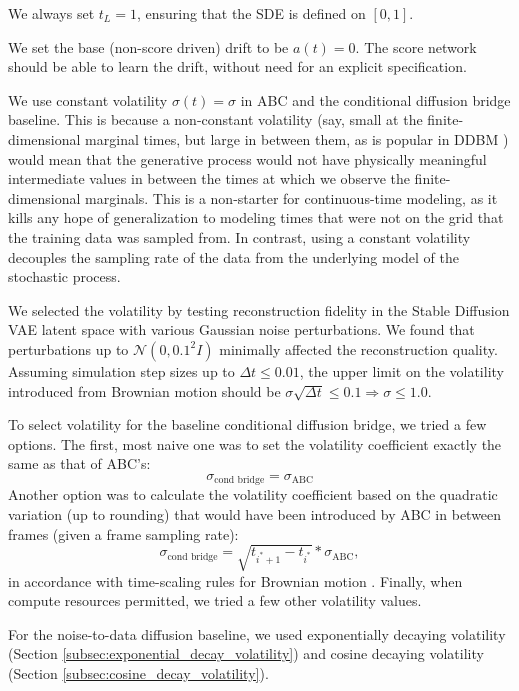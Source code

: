 We always set $t_L = 1$, ensuring that the SDE is defined on $[0, 1]$.

We set the base (non-score driven) drift to be $a(t) = 0$. The score network should be able to learn the drift, without need for an explicit specification.

We use constant volatility $\sigma(t) = \sigma$ in ABC and the conditional diffusion bridge baseline.
This is because a non-constant volatility (say, small at the finite-dimensional marginal times, but large in between them, as is popular in DDBM \cite{zhou2023denoising}) would mean that the generative process would not have physically meaningful intermediate values in between the times at which we observe the finite-dimensional marginals. This is a non-starter for continuous-time modeling, as it kills any hope of generalization to modeling times that were not on the grid that the training data was sampled from.
In contrast, using a constant volatility decouples the sampling rate of the data from the underlying model of the stochastic process.

We selected the volatility by testing reconstruction fidelity in the Stable Diffusion VAE latent space \cite{rombach2022high} with various Gaussian noise perturbations. We found that perturbations up to $\mathcal{N}(0, 0.1^2 I)$ minimally affected the reconstruction quality. Assuming simulation step sizes up to $\Delta t \leq 0.01$, the upper limit on the volatility introduced from Brownian motion should be $\sigma \sqrt{\Delta t} \leq 0.1 \Rightarrow \sigma \leq 1.0$.

To select volatility for the baseline conditional diffusion bridge, we tried a few options.
The first, most naive one was to set the volatility coefficient exactly the same as that of ABC's:
\begin{equation}
    \sigma_\text{cond bridge} = \sigma_\text{ABC}
\end{equation}
Another option was to calculate the volatility coefficient based on the quadratic variation (up to rounding) that would have been introduced by ABC in between frames (given a frame sampling rate):
\begin{equation}
    \sigma_\text{cond bridge} = \sqrt{t_{i^*+1} - t_{i^*}} * \sigma_\text{ABC},
\end{equation}
in accordance with time-scaling rules for Brownian motion \cite{steele2001stochastic}.
Finally, when compute resources permitted, we tried a few other volatility values.

For the noise-to-data diffusion baseline, we used exponentially decaying volatility (Section \ref{subsec:exponential_decay_volatility}) and cosine decaying volatility (Section \ref{subsec:cosine_decay_volatility}).

